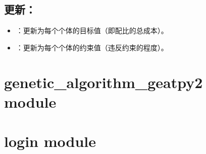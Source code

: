 \documentclass[a4paper,12pt,english]{sphinxmanual}
\begin{document}
\begin{fulllineitems}
\begin{fulllineitems}
\begin{description}
\end{description}


\section{更新：}
\label{\detokenize{api/genetic_algorithm_geatpy1:id2}}\begin{itemize}
\item {} 
\sphinxAtStartPar
{}：更新为每个个体的目标值（即配比的总成本）。

\item {} 
\sphinxAtStartPar
{}：更新为每个个体的约束值（违反约束的程度）。

\end{itemize}

\end{fulllineitems}


\end{fulllineitems}


\sphinxstepscope


\chapter{genetic\_algorithm\_geatpy2 module}
\label{\detokenize{api/genetic_algorithm_geatpy2:module-genetic_algorithm_geatpy2}}\label{\detokenize{api/genetic_algorithm_geatpy2:genetic-algorithm-geatpy2-module}}\label{\detokenize{api/genetic_algorithm_geatpy2::doc}}
\sphinxstepscope


\chapter{login module}
\label{\detokenize{api/login:module-login}}\label{\detokenize{api/login:login-module}}\label{\detokenize{api/login::doc}}
\end{document}
